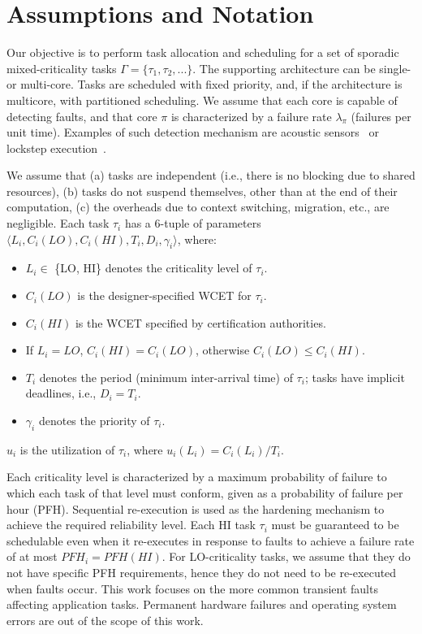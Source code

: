 \documentclass[conference]{IEEEtran}
\begin{document}
\section{Assumptions and Notation}
\label{sec:notation}
Our objective is to perform task allocation and scheduling for a set of sporadic mixed-criticality tasks $\Gamma = \{\tau_1,\tau_2,...\}$. The supporting architecture can be single- or multi-core. Tasks are scheduled with fixed priority, and, if the architecture is multicore, with partitioned scheduling. We assume that each core is capable of detecting faults, and that core $\pi$ is characterized by a failure rate $\lambda_{\pi}$ (failures per unit time). Examples of such detection mechanism are acoustic sensors~\cite{upasani2014avoiding} or lockstep execution~\cite{baleani2003}. 


We assume that (a) tasks are independent (i.e., there is no blocking due to shared resources), (b) tasks do not suspend themselves, other than at the end of their computation, (c) the overheads due to context switching, migration, etc., are negligible. Each task $\tau_i$ has a 6-tuple of parameters $\langle L_i, C_i(LO), C_i(HI), T_i, D_i, \gamma_i \rangle$, where:
\begin{itemize}
  \item $L_i \in $  \{LO, HI\} denotes the criticality level of $\tau_i$.
  \item $C_i(LO)$ is the designer-specified WCET for $\tau_i$.
  \item $C_i(HI)$ is the WCET specified by certification authorities.
  \item If $L_i=LO$, $C_i(HI)=C_i(LO)$, otherwise $C_i(LO)\leq C_i(HI)$.
  \item $T_i$ denotes the period (minimum inter-arrival time) of $\tau_i$; tasks have implicit deadlines, i.e., $D_i=T_i$.
\item $\gamma_i$ denotes the priority of $\tau_i$.
\end{itemize}
$u_i$ is the utilization of $\tau_i$, where $u_i(L_i)=C_i(L_i)/T_i$.

Each criticality level is characterized by a maximum probability of failure to which each task of that level must conform, given as a probability of failure per hour (PFH). Sequential re-execution is used as the hardening mechanism to achieve the required reliability level. Each HI task $\tau_i$ must be guaranteed to be schedulable even when it re-executes in response to faults to achieve a failure rate of at most $PFH_i = PFH({HI})$. For LO-criticality tasks, we assume that they do not have specific PFH requirements, hence they do not need to be re-executed when faults occur. This work focuses on the more common transient faults affecting application tasks. Permanent hardware failures and operating system errors are out of the scope of this work.
\end{document}
